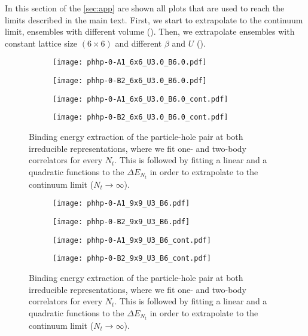 In this section of the \cref{sec:app} are shown all plots that are used to reach the limits described in the main text. First, we start to extrapolate to the continuum limit, ensembles with different volume (). Then, we extrapolate ensembles with constant lattice size $(6\times6)$ and different $\beta$ and $U$ ().
\begin{figure}
  \begin{subfigure}{.5\textwidth}
    \centering
    \texttt{[image: phhp-0-A1\_6x6\_U3.0\_B6.0.pdf]}
  \end{subfigure}%
  \begin{subfigure}{.5\textwidth}
    \centering
    \texttt{[image: phhp-0-B2\_6x6\_U3.0\_B6.0.pdf]}
  \end{subfigure}
  \begin{subfigure}{.5\textwidth}
      \centering
      \texttt{[image: phhp-0-A1\_6x6\_U3.0\_B6.0\_cont.pdf]}
  \end{subfigure}
  \begin{subfigure}{.5\textwidth}
      \centering
      \texttt{[image: phhp-0-B2\_6x6\_U3.0\_B6.0\_cont.pdf]}
  \end{subfigure}
  \caption{Binding energy extraction of the particle-hole pair at both irreducible representations, where we fit one- and two-body correlators for every $N_t$. This is followed by fitting a linear and a quadratic functions to the $\Delta E_{N_t}$ in order to extrapolate to the continuum limit ($N_t\to\infty$).}
  \label{fig:fig1}
\end{figure}

\begin{figure}
  \begin{subfigure}{.5\textwidth}
    \centering
    \texttt{[image: phhp-0-A1\_9x9\_U3\_B6.pdf]}
  \end{subfigure}%
  \begin{subfigure}{.5\textwidth}
    \centering
    \texttt{[image: phhp-0-B2\_9x9\_U3\_B6.pdf]}
  \end{subfigure}
  \begin{subfigure}{.5\textwidth}
      \centering
      \texttt{[image: phhp-0-A1\_9x9\_U3\_B6\_cont.pdf]}
  \end{subfigure}
  \begin{subfigure}{.5\textwidth}
      \centering
      \texttt{[image: phhp-0-B2\_9x9\_U3\_B6\_cont.pdf]}
  \end{subfigure}
  \caption{Binding energy extraction of the particle-hole pair at both irreducible representations, where we fit one- and two-body correlators for every $N_t$. This is followed by fitting a linear and a quadratic functions to the $\Delta E_{N_t}$ in order to extrapolate to the continuum limit ($N_t\to\infty$).}
  \label{fig:fig2}
\end{figure}

